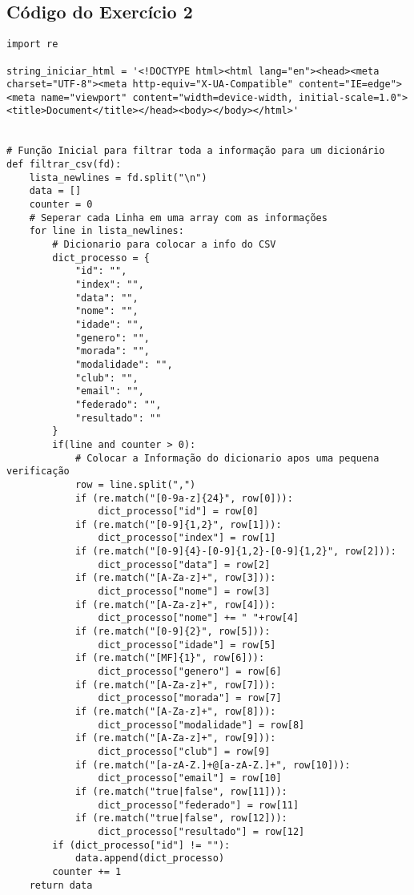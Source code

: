 \documentclass[11pt,a4paper]{report}%
\begin{document}
\subsection{Código do Exercício 2} \label{subsec:pyEx2}
\begin{verbatim}
import re

string_iniciar_html = '<!DOCTYPE html><html lang="en"><head><meta charset="UTF-8"><meta http-equiv="X-UA-Compatible" content="IE=edge"><meta name="viewport" content="width=device-width, initial-scale=1.0"><title>Document</title></head><body></body></html>'


# Função Inicial para filtrar toda a informação para um dicionário
def filtrar_csv(fd):
    lista_newlines = fd.split("\n")
    data = []
    counter = 0
    # Seperar cada Linha em uma array com as informações
    for line in lista_newlines:
        # Dicionario para colocar a info do CSV
        dict_processo = {
            "id": "",
            "index": "",
            "data": "",
            "nome": "",
            "idade": "",
            "genero": "",
            "morada": "",
            "modalidade": "",
            "club": "",
            "email": "",
            "federado": "",
            "resultado": ""
        }
        if(line and counter > 0):
            # Colocar a Informação do dicionario apos uma pequena verificação
            row = line.split(",")
            if (re.match("[0-9a-z]{24}", row[0])):
                dict_processo["id"] = row[0]
            if (re.match("[0-9]{1,2}", row[1])):
                dict_processo["index"] = row[1]
            if (re.match("[0-9]{4}-[0-9]{1,2}-[0-9]{1,2}", row[2])):
                dict_processo["data"] = row[2]
            if (re.match("[A-Za-z]+", row[3])):
                dict_processo["nome"] = row[3]
            if (re.match("[A-Za-z]+", row[4])):
                dict_processo["nome"] += " "+row[4]
            if (re.match("[0-9]{2}", row[5])):
                dict_processo["idade"] = row[5]
            if (re.match("[MF]{1}", row[6])):
                dict_processo["genero"] = row[6]
            if (re.match("[A-Za-z]+", row[7])):
                dict_processo["morada"] = row[7]
            if (re.match("[A-Za-z]+", row[8])):
                dict_processo["modalidade"] = row[8]
            if (re.match("[A-Za-z]+", row[9])):
                dict_processo["club"] = row[9]
            if (re.match("[a-zA-Z.]+@[a-zA-Z.]+", row[10])):
                dict_processo["email"] = row[10]
            if (re.match("true|false", row[11])):
                dict_processo["federado"] = row[11]
            if (re.match("true|false", row[12])):
                dict_processo["resultado"] = row[12]
        if (dict_processo["id"] != ""):
            data.append(dict_processo)
        counter += 1
    return data



\end{verbatim}
\end{document}
